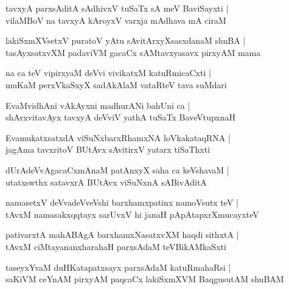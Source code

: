 \begin{shloka}
tavxyA parxsAditA sAdhivxV tuSaTx sA meV BaviSayxti |\\
vilaMBoV na tavxyA kAroyxV varxja mAdhava mA ciraM 
\end{shloka}

\begin{shloka}
lakiSxmXVsetxV puratoV yAtu sAvitArxyXsasxdanaM shuBA |\\
tasAyxsatxvXM padaviVM gacaCx sAMtavxyasavx pirxyAM mama
\end{shloka}

\begin{shloka}
na ca teV vipirxyaM deVvi vivikatxM katuRmicaCxti |\\
muKaM perxVkaSxyX sadAkAlaM vataRteV tava suMdari
\end{shloka}

\begin{shloka}
EvaMvidhAni vAkAyxni madhurANi bahUni ca |\\
shArxvitavAyx tavxyA deVviV yathA tuSaTx BaveVtupxnaH 
\end{shloka}

\begin{shloka}
EvamukatxsatxdA viSuNxbarxRhamxNA loVkakataqRNA |\\
jagAma tavxritoV BUtAvx sAvitirxV yatarx tiSaThxti 
\end{shloka}

\begin{shloka}
dUrAdeVvAgacaCxmAnaM patAnxyX saha ca keVshavaM |\\
utatxswthx satavxrA BUtAvx viSuNxnA sABivAditA 
\end{shloka}

\begin{shloka}
namasetxV deVvadeVveVshi barxhamxpatinx namoVsutx teV |\\
tAvxM namasakxqqtayx sarUvxV hi janaH pApAtapxrXmucayxteV 
\end{shloka}

\begin{shloka}
pativarxtA mahABAgA barxhamxNasatxvXM haqdi sithxtA |\\
tAvxM ciMtayananxharahaH parxsAdaM teVBikAMkaSxti 
\end{shloka}

\begin{shloka}
taseyxYvaM duHKatapatxsayx parxsAdaM katuRmahaRsi |\\
saKiVM ceYnAM pirxyAM paqcaCx lakiSxmXVM BaqgusutAM shuBAM 
\end{shloka}

